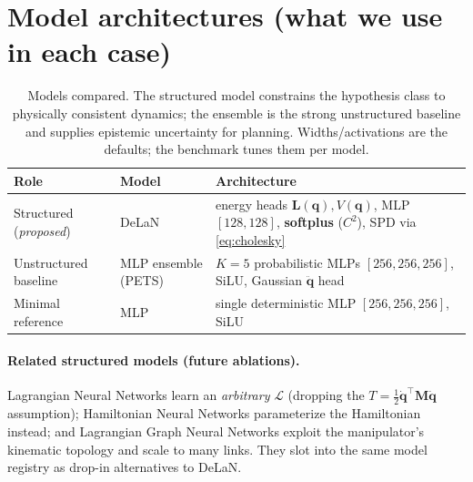 \documentclass[11pt]{article}
\newcommand{\q}{\bm{q}}
\newcommand{\qd}{\dot{\bm{q}}}
\newcommand{\qdd}{\ddot{\bm{q}}}
\newcommand{\M}{\bm{M}}
\newcommand{\Lo}{\bm{L}}
\begin{document}
\section{Model architectures (what we use in each case)}
\label{sec:arch}
\begin{table}[h]
\centering
\begin{tabular}{@{}lll@{}}
\toprule
Role & Model & Architecture \\
\midrule
Structured (\emph{proposed}) & DeLaN \cite{lutter2019delan} &
  energy heads $\Lo(\q),V(\q)$, MLP $[128,128]$, \textbf{softplus} ($C^2$),
  SPD via \eqref{eq:cholesky} \\
Unstructured baseline & MLP ensemble (PETS) \cite{chua2018pets} &
  $K{=}5$ probabilistic MLPs $[256,256,256]$, SiLU, Gaussian $\qdd$ head \\
Minimal reference & MLP & single deterministic MLP $[256,256,256]$, SiLU \\
\bottomrule
\end{tabular}
\caption{Models compared. The structured model constrains the hypothesis class
to physically consistent dynamics; the ensemble is the strong unstructured
baseline and supplies epistemic uncertainty for planning. Widths/activations are
the defaults; the benchmark tunes them per model.}
\end{table}

\paragraph{Related structured models (future ablations).}
Lagrangian Neural Networks \cite{cranmer2020lnn} learn an \emph{arbitrary}
$\mathcal{L}$ (dropping the $T=\tfrac12\qd^\top\M\qd$ assumption); Hamiltonian
Neural Networks \cite{greydanus2019hnn} parameterize the Hamiltonian instead;
and Lagrangian Graph Neural Networks \cite{bhattoo2022lgnn} exploit the
manipulator's kinematic topology and scale to many links. They slot into the
same model registry as drop-in alternatives to DeLaN.
\end{document}

